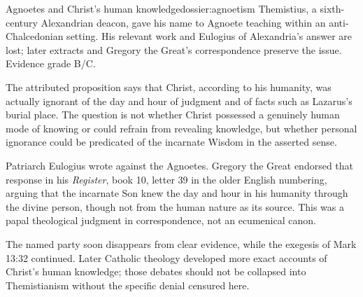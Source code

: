 \begin{heresydossier}{Agnoetes and Christ's human knowledge}{dossier:agnoetism}
\objectfield Themistius, a sixth-century Alexandrian deacon, gave his name to Agnoete teaching within an anti-Chalcedonian setting. His relevant work and Eulogius of Alexandria's answer are lost; later extracts and Gregory the Great's correspondence preserve the issue. Evidence grade B/C.

\propositionfield The attributed proposition says that Christ, according to his humanity, was actually ignorant of the day and hour of judgment and of facts such as Lazarus's burial place. The question is not whether Christ possessed a genuinely human mode of knowing or could refrain from revealing knowledge, but whether personal ignorance could be predicated of the incarnate Wisdom in the asserted sense.

\responsefield Patriarch Eulogius wrote against the Agnoetes. Gregory the Great endorsed that response in his \emph{Register}, book 10, letter 39 in the older English numbering, arguing that the incarnate Son knew the day and hour in his humanity through the divine person, though not from the human nature as its source. This was a papal theological judgment in correspondence, not an ecumenical canon.

\aftermathfield The named party soon disappears from clear evidence, while the exegesis of Mark 13:32 continued. Later Catholic theology developed more exact accounts of Christ's human knowledge; those debates should not be collapsed into Themistianism without the specific denial censured here.
\end{heresydossier}
